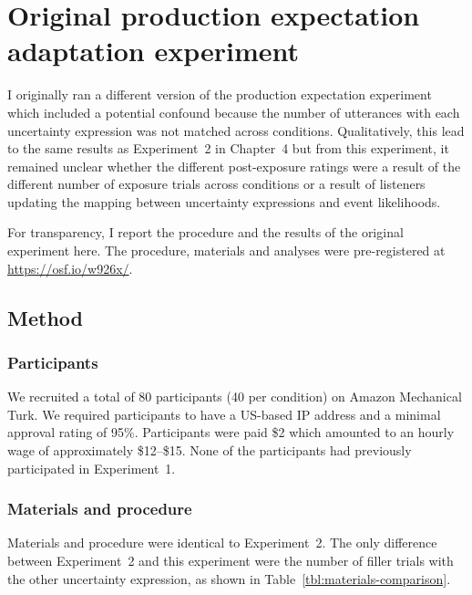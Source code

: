 \chapter[Original adaptation experiment]{Original production expectation adaptation experiment}


I originally ran a different version of the production expectation experiment which included a potential confound because the number of utterances
with each uncertainty expression was not matched across conditions. Qualitatively, this lead to the same results as Experiment~2 in Chapter~4
but from this experiment, it remained unclear whether the different post-exposure ratings were a result of the different number of exposure trials
across conditions or a result of listeners updating the mapping between uncertainty expressions and event likelihoods.  

For transparency, I report the procedure and the results of the original experiment here. The procedure, materials and analyses were pre-registered at \url{https://osf.io/w926x/}.

\section{Method}
\subsection{Participants}
We recruited a total of 80 participants (40 per condition) on Amazon Mechanical Turk. 
We required participants to have a US-based IP address and a minimal approval rating 
of 95\%. Participants were paid \$2 which amounted to an hourly wage of approximately 
\$12--\$15. None of the participants had previously participated in Experiment~1.

\subsection{Materials and procedure}

Materials and procedure were identical to Experiment~2. The only difference between Experiment~2 and this experiment were the number of filler trials with the other uncertainty expression, as shown in Table~\ref{tbl:materials-comparison}.

